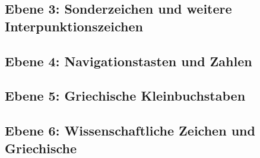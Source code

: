 \documentclass{beamer}
\begin{document}
\subsection{Ebene 3: Sonderzeichen und weitere Interpunktionszeichen}

\subsection{Ebene 4: Navigationstasten und Zahlen}

\subsection{Ebene 5: Griechische Kleinbuchstaben}

\subsection{Ebene 6: Wissenschaftliche Zeichen und Griechische}
\end{document}
